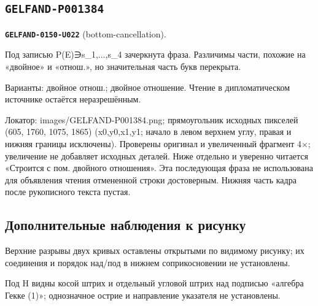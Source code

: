 \documentclass[11pt]{article}
\theoremstyle{definition}
\theoremstyle{remark}
\begin{document}
\subsection*{\texttt{GELFAND-P001384}}
\noindent\leavevmode{}\label{GELFAND-P001384:bottom-cancellation:note}\textbf{\texttt{GELFAND-0150-U022}} (bottom-cancellation).\par\nopagebreak[4]
Под записью P(E)∋s\_1,...,s\_4 зачеркнута фраза. Различимы части, похожие на «двойное» и «отнош.», но значительная часть букв перекрыта.\par
Варианты: двойное отнош.; двойное отношение. Чтение в дипломатическом источнике остаётся неразрешённым.\par
Локатор: images/GELFAND-P001384.png; прямоугольник исходных пикселей (605, 1760, 1075, 1865) (x0,y0,x1,y1; начало в левом верхнем углу, правая и нижняя границы исключены). Проверены оригинал и увеличенный фрагмент 4×; увеличение не добавляет исходных деталей. Ниже отдельно и уверенно читается «Строится с пом. двойного отношения». Эта последующая фраза не использована для объявления чтения отмененной строки достоверным. Нижняя часть кадра после рукописного текста пустая.\par\medskip
\subsection*{Дополнительные наблюдения к рисунку}
\label{GELFAND-P001375:braids-links-connectivity:note}
Верхние разрывы двух кривых оставлены открытыми по видимому рисунку; их соединения и порядок над/под в нижнем соприкосновении не установлены.\par
{}\label{GELFAND-P001375:hecke-indicator:note}
Под H видны косой штрих и отдельный угловой штрих над подписью «алгебра Гекке (1)»; однозначное острие и направление указателя не установлены.\par
\end{document}
